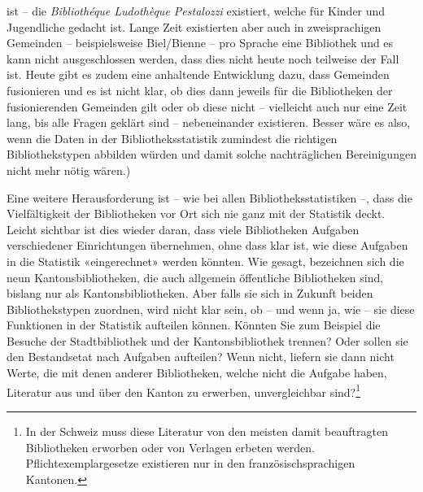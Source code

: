 \documentclass[a4paper,
fontsize=11pt,
oneside,
numbers=noperiodatend,
parskip=half-,
bibliography=totoc,
final
]{scrartcl}
\begin{document}
\begin{itemize}
{    ist -- die \emph{Bibliothéque Ludothèque Pestalozzi} existiert,
    welche für Kinder und Jugendliche gedacht ist. Lange Zeit
    existierten aber auch in zweisprachigen Gemeinden -- beispielsweise
    Biel/Bienne -- pro Sprache eine Bibliothek und es kann nicht
    ausgeschlossen werden, dass dies nicht heute noch teilweise der Fall
    ist. Heute gibt es zudem eine anhaltende Entwicklung dazu, dass
    Gemeinden fusionieren und es ist nicht klar, ob dies dann jeweils
    für die Bibliotheken der fusionierenden Gemeinden gilt oder ob diese
    nicht -- vielleicht auch nur eine Zeit lang, bis alle Fragen geklärt
    sind -- nebeneinander existieren. Besser wäre es also, wenn die
    Daten in der Bibliotheksstatistik zumindest die richtigen
    Bibliothekstypen abbilden würden und damit solche nachträglichen
    Bereinigungen nicht mehr nötig wären.})
\end{itemize}

Eine weitere Herausforderung ist -- wie bei allen Bibliotheksstatistiken
--, dass die Vielfältigkeit der Bibliotheken vor Ort sich nie ganz mit
der Statistik deckt. Leicht sichtbar ist dies wieder daran, dass viele
Bibliotheken Aufgaben verschiedener Einrichtungen übernehmen, ohne dass
klar ist, wie diese Aufgaben in die Statistik «eingerechnet» werden
könnten. Wie gesagt, bezeichnen sich die neun Kantonsbibliotheken, die
auch allgemein öffentliche Bibliotheken sind, bislang nur als
Kantonsbibliotheken. Aber falls sie sich in Zukunft beiden
Bibliothekstypen zuordnen, wird nicht klar sein, ob -- und wenn ja, wie
-- sie diese Funktionen in der Statistik aufteilen können. Könnten Sie
zum Beispiel die Besuche der Stadtbibliothek und der Kantonsbibliothek
trennen? Oder sollen sie den Bestandsetat nach Aufgaben aufteilen? Wenn
nicht, liefern sie dann nicht Werte, die mit denen anderer Bibliotheken,
welche nicht die Aufgabe haben, Literatur aus und über den Kanton zu
erwerben, unvergleichbar sind?\footnote{In der Schweiz muss diese
  Literatur von den meisten damit beauftragten Bibliotheken erworben
  oder von Verlagen erbeten werden. Pflichtexemplargesetze existieren
  nur in den französischsprachigen Kantonen.}
\end{document}
